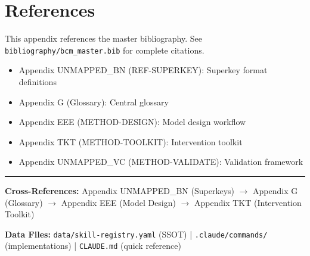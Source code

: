 
\section{References}
\label{sec:sk-references}

This appendix references the master bibliography. See \texttt{bibliography/bcm\_master.bib}
for complete citations.

\nocite{bcm_master}

\begin{itemize}
\item Appendix UNMAPPED_BN (REF-SUPERKEY): Superkey format definitions
\item Appendix G (Glossary): Central glossary
\item Appendix EEE (METHOD-DESIGN): Model design workflow
\item Appendix TKT (METHOD-TOOLKIT): Intervention toolkit
\item Appendix UNMAPPED_VC (METHOD-VALIDATE): Validation framework
\end{itemize}


\vfill
\hrule
\vspace{0.5em}
\small
\textbf{Cross-References:}
Appendix UNMAPPED_BN (Superkeys) $\rightarrow$
Appendix G (Glossary) $\rightarrow$
Appendix EEE (Model Design) $\rightarrow$
Appendix TKT (Intervention Toolkit)

\textbf{Data Files:}
\texttt{data/skill-registry.yaml} (SSOT) |
\texttt{.claude/commands/} (implementations) |
\texttt{CLAUDE.md} (quick reference)

\normalsize
